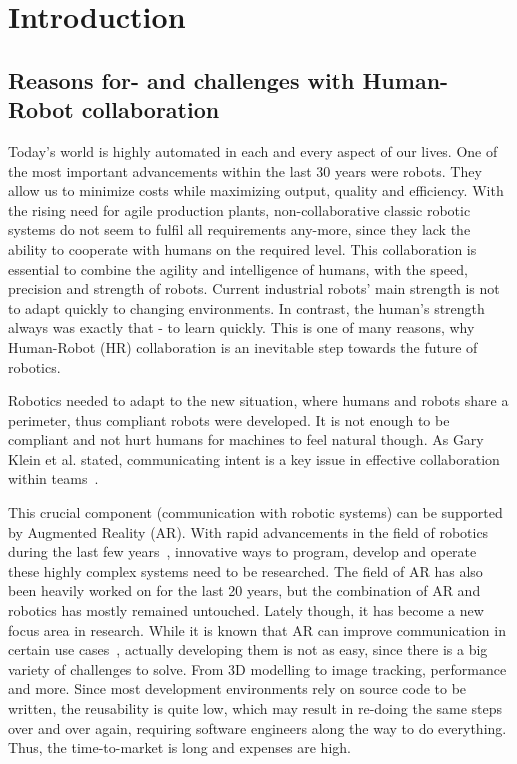 \chapter{Introduction}\label{Chap:Introduction}

\section{Reasons for- and challenges with Human-Robot collaboration}\label{Section:ProblemDescription}

Today's world is highly automated in each and every aspect of our lives. One of the most important advancements within the last 30 years were robots. They allow us to minimize costs while maximizing output, quality and efficiency. With the rising need for agile production plants, non-collaborative classic robotic systems do not seem to fulfil all requirements any-more, since they lack the ability to cooperate with humans on the required level. This collaboration is essential to combine the agility and intelligence of humans, with the speed, precision and strength of robots. Current industrial robots' main strength is not to adapt quickly to changing environments. In contrast, the human's strength always was exactly that - to learn quickly. This is one of many reasons, why Human-Robot (HR) collaboration is an inevitable step towards the future of robotics.

Robotics needed to adapt to the new situation, where humans and robots share a perimeter, thus compliant robots were developed. It is not enough to be compliant and not hurt humans for machines to feel natural though. As Gary Klein et al. stated, communicating intent is a key issue in effective collaboration within teams~\cite{klein2005common}. 

This crucial component (communication with robotic systems) can be supported by Augmented Reality (AR). With rapid advancements in the field of robotics during the last few years~\cite{laschi2016soft}, innovative ways to program, develop and operate these highly complex systems need to be researched. The field of AR has also been heavily worked on for the last 20 years, but the combination of AR and robotics has mostly remained untouched. Lately though, it has become a new focus area in research. While it is known that AR can improve communication in certain use cases~\cite{ARCommunicationBenefits}, actually developing them is not as easy, since there is a big variety of challenges to solve. From 3D modelling to image tracking, performance and more. Since most development environments rely on source code to be written, the reusability is quite low, which may result in re-doing the same steps over and over again, requiring software engineers along the way to do everything. Thus, the time-to-market is long and expenses are high.

